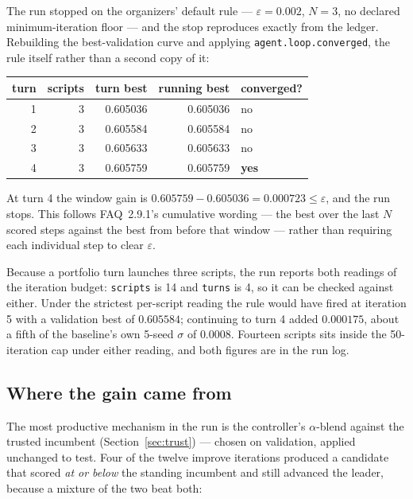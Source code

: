 \documentclass[11pt,a4paper]{article}
\newcommand{\code}[1]{\texttt{#1}}
\begin{document}
The run stopped on the organizers' default rule --- $\varepsilon = 0.002$, $N = 3$, no declared
minimum-iteration floor --- and the stop reproduces exactly from the ledger. Rebuilding the
best-validation curve and applying \code{agent.loop.converged}, the rule itself rather than a
second copy of it:

\begin{center}
\small
\begin{tabular}{@{}rrrrl@{}}
\toprule
\textbf{turn} & \textbf{scripts} & \textbf{turn best} & \textbf{running best} & \textbf{converged?} \\
\midrule
1 & 3 & 0.605036 & 0.605036 & no \\
2 & 3 & 0.605584 & 0.605584 & no \\
3 & 3 & 0.605633 & 0.605633 & no \\
4 & 3 & 0.605759 & 0.605759 & \textbf{yes} \\
\bottomrule
\end{tabular}
\end{center}

\noindent
At turn 4 the window gain is $0.605759 - 0.605036 = 0.000723 \le \varepsilon$, and the run
stops. This follows FAQ~2.9.1's cumulative wording --- the best over the last $N$ scored steps
against the best from before that window --- rather than requiring each individual step to
clear $\varepsilon$.

Because a portfolio turn launches three scripts, the run reports both readings of the
iteration budget: \code{scripts} is 14 and \code{turns} is 4, so it can be checked against
either. Under the strictest per-script reading the rule would have fired at iteration 5 with a
validation best of $0.605584$; continuing to turn 4 added $0.000175$, about a fifth of the
baseline's own 5-seed $\sigma$ of $0.0008$. Fourteen scripts sits inside the 50-iteration cap
under either reading, and both figures are in the run log.

\subsection{Where the gain came from}
\label{sec:gain}

The most productive mechanism in the run is the controller's $\alpha$-blend against the
trusted incumbent (Section~\ref{sec:trust}) --- chosen on validation, applied unchanged to
test. Four of the twelve improve iterations produced a candidate that scored \emph{at or below}
the standing incumbent and still advanced the leader, because a mixture of the two beat both:
\end{document}
